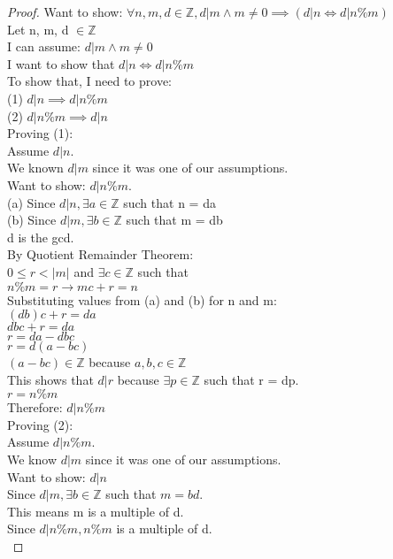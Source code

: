 \documentclass[11pt]{article}
\begin{document}
\begin{enumerate}
\begin{proof}
Want to show: $\forall n, m, d \in \mathbb{Z}, d|m \land m \neq 0 \implies (d|n \iff d|n \% m)$\\
Let n, m, d $\in \mathbb{Z}$\\
I can assume: $d|m \land m\neq 0$ \\
I want to show that $d|n \iff d|n \% m $ \\
To show that, I need to prove:\\
(1) $d|n \implies d|n \%m$ \\
(2) $d|n \%m \implies d|n$ \\
Proving (1):\\
Assume $d|n$. \\
We known $d|m$ since it was one of our assumptions. \\
Want to show: $d|n \%m$. \\
(a) Since $d|n, \exists a \in \mathbb{Z}$ such that n = da \\
(b) Since $d|m, \exists b \in \mathbb{Z}$ such that m = db \\
d is the gcd. \\
By Quotient Remainder Theorem: \\
$0 \leq r < |m|$ and $\exists c \in \mathbb{Z}$ such that \\
$n \% m = r \rightarrow mc + r = n$ \\
Substituting values from (a) and (b) for n and m: \\
$(db)c + r = da$ \\
$dbc + r = da$ \\
$r = da - dbc$ \\
$r = d(a-bc)$ \\
$(a-bc) \in \mathbb{Z}$ because $a, b, c \in \mathbb{Z}$ \\
This shows that $d|r$ because $\exists p \in \mathbb{Z}$ such that r = dp. \\
$r = n \% m$ \\
Therefore: $d|n\%m$ \\
Proving (2): \\
Assume $d|n\%m$. \\
We know $d|m$ since it was one of our assumptions. \\
Want to show: $d|n$ \\
Since $d|m, \exists b \in \mathbb{Z}$ such that $m=bd$. \\
This means m is a multiple of d. \\
Since $d|n\%m, n\%m$ is a multiple of d. \\

\end{proof}
\end{enumerate}
\end{document}
